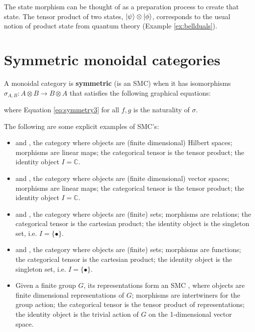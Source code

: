 \noindent The state morphism can be thought of as a preparation process to create that state. The tensor product of two states, $| \psi \rangle\otimes| \phi \rangle$, corresponds to the usual notion of product state from quantum theory (Example \ref{ex:bellduals}).

\section{Symmetric monoidal categories}

\begin{defn}
A monoidal category is \textbf{symmetric} (is an SMC) when it has  isomorphisms
$\sigma_{A,B}:A\otimes B\to B\otimes A$ that satisfies the following graphical equations:
\begin{equation}
\label{eq:symmetry}

\end{equation}
\begin{equation}
\label{eq:symmetry2}

\end{equation}
\begin{equation}
\label{eq:symmetry3}

\end{equation}
\end{defn}
\noindent where Equation \ref{eq:symmetry3} for all $f,g$ is the naturality of $\sigma$.

\begin{examples}
\label{ex:smcs}
The following are some explicit examples of SMC's:
\begin{itemize}
\item {} and , the category where objects are (finite dimensional) Hilbert spaces; morphisms are linear maps; the categorical tensor is the tensor product; the identity object $I=\mathbb{C}$.

\item {} and , the category where objects are (finite dimensional) vector spaces; morphisms are linear maps; the categorical tensor is the tensor product; the identity object $I=\mathbb{C}$.

\item {} and , the category where objects are (finite) sets; morphisms are relations; the categorical tensor is the cartesian product; the identity object is the singleton set, i.e. $I=\{\bullet\}$.

\item {} and , the category where objects are (finite) sets; morphisms are functions; the categorical tensor is the cartesian product; the identity object is the singleton set, i.e. $I=\{\bullet\}$.

\item Given a finite group $G$, its representations form an SMC , where objects are finite dimensional representations of $G$; morphisms are intertwiners for the group action; the categorical tensor is the tensor product of representations; the identity object is the trivial action of $G$ on the 1-dimensional vector space.
\end{itemize}
\end{examples}


